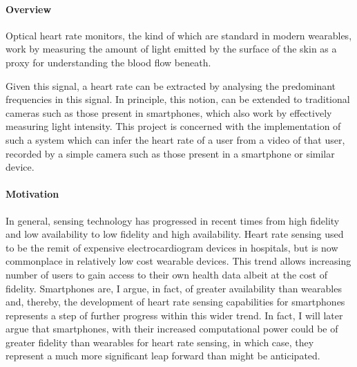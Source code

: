 \paragraph{Overview}
Optical heart rate monitors, the kind of which are standard in modern wearables, work by measuring the amount of light emitted by the surface of the skin 
as a proxy for understanding the blood flow beneath.

Given this signal, a heart rate can be extracted by analysing the predominant frequencies in this signal. In principle, 
this notion, can be extended to traditional cameras such as those present in smartphones, which also work by effectively measuring light intensity.
This project is concerned with the implementation of such a system which can infer the heart rate of a user from a video of that user, recorded by a simple camera such as those
present in a smartphone or similar device.

\paragraph{Motivation}
In general, sensing technology has progressed in recent times from high fidelity and low availability to low fidelity and high availability.
Heart rate sensing used to be the remit of expensive electrocardiogram devices in hospitals, but is now commonplace in relatively low cost wearable devices.
This trend allows increasing number of users to gain access to their own health data albeit at the cost of fidelity.
Smartphones are, I argue, in fact, of greater availability than wearables and, thereby, the development of heart rate sensing capabilities for 
smartphones represents a step of further progress within this wider trend. 
In fact, I will later argue that smartphones, with their increased computational power 
could be of greater fidelity than wearables for heart rate sensing, in which case, they represent a much more significant 
leap forward than might be anticipated.
